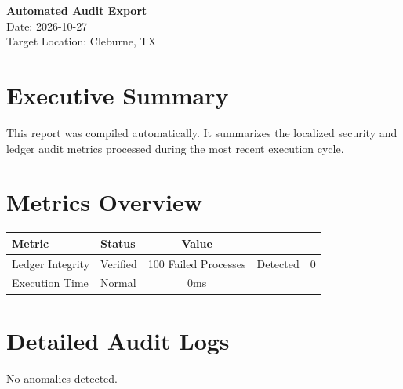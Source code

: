 \documentclass[11pt, a4paper]{article}
\begin{document}
\begin{center}
    {\Huge\bfseries Automated Audit Export} \\[0.5em]
    {\large Date: 2026-10-27} \\[0.5em]
    {\large Target Location: Cleburne, TX}
\end{center}

\vspace{2em}

\section{\textcolor{primary}{Executive Summary}}
This report was compiled automatically. It summarizes the localized security and ledger audit metrics processed during the most recent execution cycle.

\section{\textcolor{primary}{Metrics Overview}}
\begin{table}[h]
    \centering
    \renewcommand{\arraystretch}{1.3}
    \begin{tabular}{@{}llc@{}}
        \toprule
        \textbf{Metric} & \textbf{Status} & \textbf{Value} \\
        \midrule
        Ledger Integrity & \textcolor{statusgreen}{Verified} & 100%
        Failed Processes & \textcolor{statusred}{Detected} & 0 \\
        Execution Time & Normal & 0ms \\
        \bottomrule
    \end{tabular}
\end{table}

\section{\textcolor{primary}{Detailed Audit Logs}}
No anomalies detected.
\end{document}
